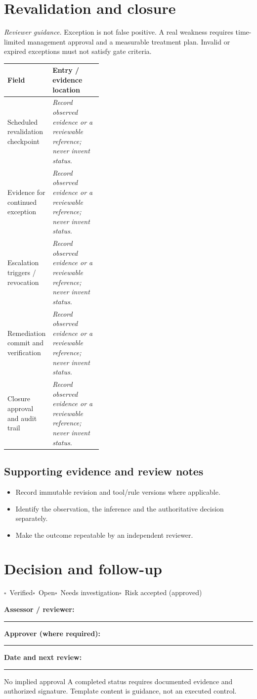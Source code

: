 \documentclass[10pt,letterpaper]{article}
\newcommand{\checkbox}{\(\square\)}
\newcommand{\blankline}{\noindent\rule{\linewidth}{0.35pt}\par\vspace{4pt}}
\begin{document}
\section{Revalidation and closure}
\textit{Reviewer guidance.} Exception is not false positive. A real weakness requires time-limited management approval and a measurable treatment plan. Invalid or expired exceptions must not satisfy gate criteria.
\begin{tabularx}{\linewidth}{@{}p{0.38\linewidth}Y@{}}
\toprule Field & Entry / evidence location\\\midrule
Scheduled revalidation checkpoint & \textit{Record observed evidence or a reviewable reference; never invent status.}\\[1.0em]
\midrule
Evidence for continued exception & \textit{Record observed evidence or a reviewable reference; never invent status.}\\[1.0em]
\midrule
Escalation triggers / revocation & \textit{Record observed evidence or a reviewable reference; never invent status.}\\[1.0em]
\midrule
Remediation commit and verification & \textit{Record observed evidence or a reviewable reference; never invent status.}\\[1.0em]
\midrule
Closure approval and audit trail & \textit{Record observed evidence or a reviewable reference; never invent status.}\\[1.0em]
\midrule
\end{tabularx}
\subsection{Supporting evidence and review notes}
\begin{itemize}
\item Record immutable revision and tool/rule versions where applicable.
\item Identify the observation, the inference and the authoritative decision separately.
\item Make the outcome repeatable by an independent reviewer.
\end{itemize}
\clearpage
\section{Decision and follow-up}
\noindent\checkbox\ Verified\quad\checkbox\ Open\quad\checkbox\ Needs investigation\quad\checkbox\ Risk accepted (approved)\par
\noindent\textbf{Assessor / reviewer:}\par\blankline\textbf{Approver (where required):}\par\blankline\textbf{Date and next review:}\par\blankline
\begin{warnbox}{No implied approval}
A completed status requires documented evidence and authorized signature. Template content is guidance, not an executed control.\end{warnbox}
\end{document}

